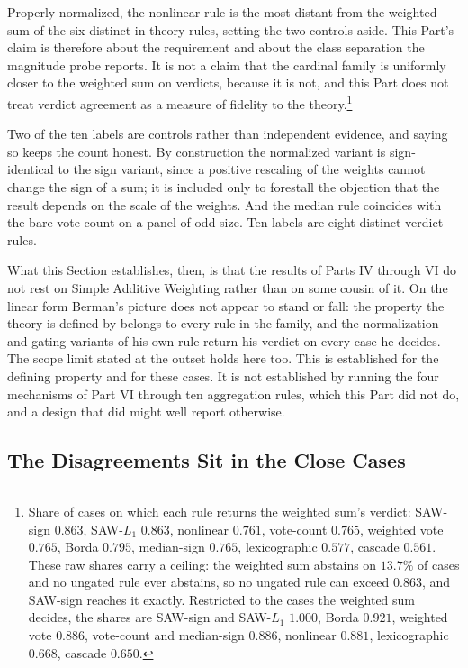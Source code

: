 Properly normalized, the nonlinear rule is the most distant from the
weighted sum of the six distinct in-theory rules, setting the two controls
aside. This Part's claim is therefore about the requirement and about the
class separation the magnitude probe reports. It is not a claim that the
cardinal family is uniformly closer to the weighted sum on verdicts,
because it is not, and this Part does not treat verdict agreement as a
measure of fidelity to the theory.\footnote{Share of cases on which each
rule returns the weighted sum's verdict: SAW-sign $0.863$, SAW-$L_1$
$0.863$, nonlinear $0.761$, vote-count $0.765$, weighted vote $0.765$,
Borda $0.795$, median-sign $0.765$, lexicographic $0.577$, cascade
$0.561$. These raw shares carry a ceiling: the weighted sum abstains on
$13.7\%$ of cases and no ungated rule ever abstains, so no ungated rule
can exceed $0.863$, and SAW-sign reaches it exactly. Restricted to the
cases the weighted sum decides, the shares are SAW-sign and SAW-$L_1$
$1.000$, Borda $0.921$, weighted vote $0.886$, vote-count and median-sign
$0.886$, nonlinear $0.881$, lexicographic $0.668$, cascade $0.650$.}

Two of the ten labels are controls rather than independent evidence, and
saying so keeps the count honest. By construction the normalized variant is
sign-identical to the sign variant, since a positive rescaling of the
weights cannot change the sign of a sum; it is included only to forestall the objection that the result
depends on the scale of the weights. And the median rule coincides with
the bare vote-count on a panel of odd size. Ten labels are eight distinct
verdict rules.

What this Section establishes, then, is that the results of Parts IV
through VI do not rest on Simple Additive Weighting rather than on some
cousin of it. On the linear form Berman's picture does not appear to stand
or fall:
the property the theory is defined by belongs to every rule in the
family, and the normalization and gating variants of his own rule return
his verdict on every case he decides. The scope limit stated at the
outset holds here too. This is established for the defining property and
for these cases. It is not established by running the four mechanisms of Part VI through ten
aggregation rules, which this Part did not do, and a design that did might
well report otherwise.

\subsection{The Disagreements Sit in the Close Cases}

